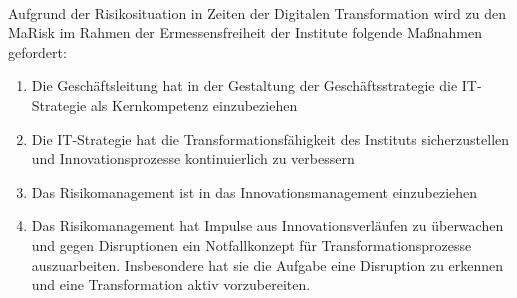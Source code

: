 \medskip
\\
Aufgrund der Risikosituation in Zeiten der Digitalen Transformation wird zu den \ac{MaRisk} \cite{MaRisk:2017} im Rahmen der Ermessensfreiheit der Institute folgende Maßnahmen gefordert:
\begin{enumerate}
    \item Die Geschäftsleitung hat in der Gestaltung der Geschäftsstrategie die IT-Strategie als Kernkompetenz einzubeziehen
    \item Die IT-Strategie hat die Transformationsfähigkeit des Instituts sicherzustellen und Innovationsprozesse kontinuierlich zu verbessern
    \item Das Risikomanagement ist in das Innovationsmanagement einzubeziehen
    \item Das Risikomanagement hat Impulse aus Innovationsverläufen zu überwachen und gegen Disruptionen ein Notfallkonzept für Transformationsprozesse auszuarbeiten. Insbesondere hat sie die Aufgabe eine Disruption zu erkennen und eine Transformation aktiv vorzubereiten.
\end{enumerate}